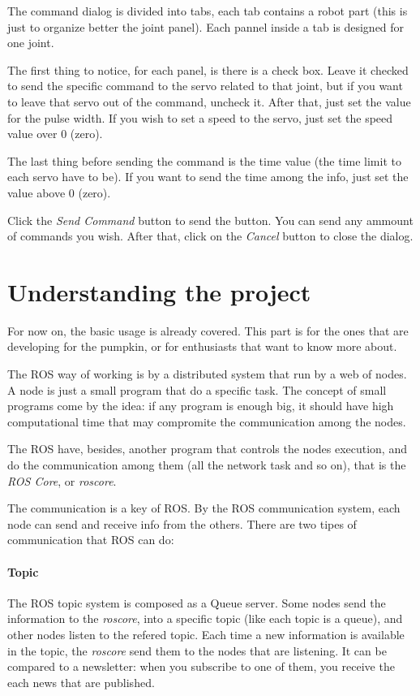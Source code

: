 \documentclass[oneside,a4paper,titlepage]{article}
\begin{document}
The command dialog is divided into tabs, each tab contains a robot part (this is just to organize better the joint panel). Each pannel inside a tab is designed for one joint.

The first thing to notice, for each panel, is there is a check box. Leave it checked to send the specific command to the servo related to that joint, but if you want to leave that servo out of the command, uncheck it. After that, just set the value for the pulse width. If you wish to set a speed to the servo, just set the speed value over $0$ (zero).

The last thing before sending the command is the time value (the time limit to each servo have to be). If you want to send the time among the info, just set the value above $0$ (zero).

Click the \emph{Send Command} button to send the button. You can send any ammount of commands you wish. After that, click on the \emph{Cancel} button to close the dialog.

\newpage
\section{Understanding the project}

For now on, the basic usage is already covered. This part is for the ones that are developing for the pumpkin, or for enthusiasts that want to know more about.

The ROS way of working is by a distributed system that run by a web of nodes. A node is just a small program that do a specific task. The concept of small programs come by the idea: if any program is enough big, it should have high computational time that may compromite the communication among the nodes.

The ROS have, besides, another program that controls the nodes execution, and do the communication among them (all the network task and so on), that is the \emph{ROS Core}, or \emph{roscore}.

The communication is a key of ROS. By the ROS communication system, each node can send and receive info from the others. There are two tipes of communication that ROS can do:

\paragraph{Topic} The ROS topic system is composed as a Queue server. Some nodes send the information to the \emph{roscore}, into a specific topic (like each topic is a queue), and other nodes listen to the refered topic. Each time a new information is available in the topic, the \emph{roscore} send them to the nodes that are listening. {\color{blue} It can be compared to a newsletter: when you subscribe to one of them, you receive the each news that are published.}
\end{document}
